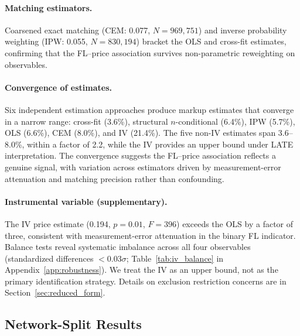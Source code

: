\paragraph{Matching estimators.}
Coarsened exact matching (CEM: 0.077, $N = 969{,}751$) and inverse
probability weighting (IPW: 0.055, $N = 830{,}194$) bracket the OLS
and cross-fit estimates, confirming that the FL--price association
survives non-parametric reweighting on observables.

\paragraph{Convergence of estimates.}
Six independent estimation approaches produce markup estimates that
converge in a narrow range: cross-fit (3.6\%), structural
$n$-conditional (6.4\%), IPW (5.7\%), OLS (6.6\%), CEM (8.0\%),
and IV (21.4\%). The five non-IV estimates span 3.6--8.0\%, within a
factor of 2.2, while the IV provides an upper bound under LATE
interpretation. The convergence suggests the FL--price association
reflects a genuine signal, with variation across estimators driven by
measurement-error attenuation and matching precision rather than
confounding.

\paragraph{Instrumental variable (supplementary).}
The IV price estimate (0.194, $p = 0.01$, $F = 396$) exceeds the OLS
by a factor of three, consistent with measurement-error attenuation
in the binary FL indicator. Balance tests reveal systematic
imbalance across all four observables (standardized differences
$< 0.03\sigma$; Table~\ref{tab:iv_balance} in
Appendix~\ref{app:robustness}). We treat the IV as an upper bound,
not as the primary identification strategy. Details on exclusion
restriction concerns are in Section~\ref{sec:reduced_form}.







\subsection{Network-Split Results}
\label{sec:results_network}

